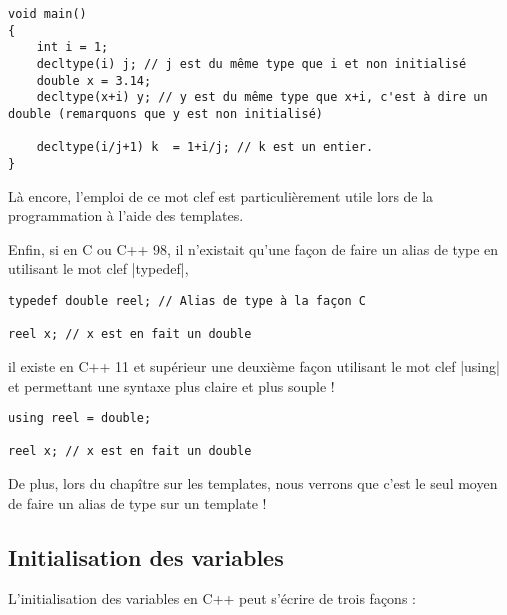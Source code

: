 \begin{lstlisting}[caption=déduction explicite de type]
void main()
{
    int i = 1;
    decltype(i) j; // j est du même type que i et non initialisé
    double x = 3.14;
    decltype(x+i) y; // y est du même type que x+i, c'est à dire un double (remarquons que y est non initialisé)

    decltype(i/j+1) k  = 1+i/j; // k est un entier.
}
\end{lstlisting}

Là encore, l'emploi de ce mot clef est particulièrement utile lors de la programmation à l'aide des templates.

Enfin, si en C ou C++ 98, il n'existait qu'une façon de faire un alias de type en utilisant le mot clef |typedef|,

\begin{lstlisting}
typedef double reel; // Alias de type à la façon C

reel x; // x est en fait un double
\end{lstlisting}

il existe en C++ 11 et supérieur une deuxième façon utilisant le mot clef |using| et permettant une syntaxe plus claire
et plus souple !

\begin{lstlisting}
using reel = double;

reel x; // x est en fait un double
\end{lstlisting}

De plus, lors du chapître sur les templates, nous verrons que c'est le seul moyen de faire un alias de type sur un template !

\subsection{Initialisation des variables}

L'initialisation des variables en C++ peut s'écrire de trois façons :

